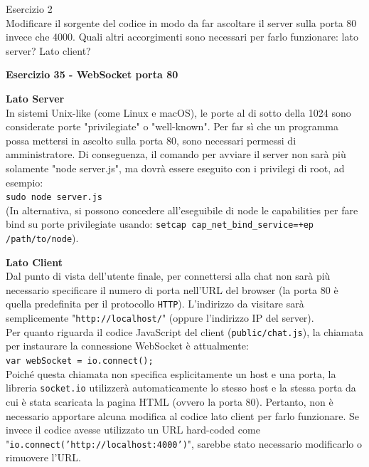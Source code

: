 \documentclass[11pt]{article}
\begin{document}
\begin{tcolorbox}[colback=blue!5!white,colframe=blue!75!black,title=\textbf{DOMANDA}, breakable]
Esercizio 2\\
Modificare il sorgente del codice in modo da far ascoltare il server sulla porta 80 invece che 4000. Quali altri accorgimenti sono necessari per farlo funzionare: lato server? Lato client?
\end{tcolorbox}

\begin{tcolorbox}[colback=green!5!white,colframe=green!75!black,title=\textbf{RISPOSTA}, breakable]
\textbf{Esercizio 35 - WebSocket porta 80}

\textbf{Lato Server}\\
In sistemi Unix-like (come Linux e macOS), le porte al di sotto della 1024 sono considerate porte "privilegiate" o "well-known". Per far sì che un programma possa mettersi in ascolto sulla porta 80, sono necessari permessi di amministratore. Di conseguenza, il comando per avviare il server non sarà più solamente "node server.js", ma dovrà essere eseguito con i privilegi di root, ad esempio:\\
\texttt{sudo node server.js}\\
(In alternativa, si possono concedere all'eseguibile di node le capabilities per fare bind su porte privilegiate usando: \texttt{setcap cap\_net\_bind\_service=+ep /path/to/node}).

\textbf{Lato Client}\\
Dal punto di vista dell'utente finale, per connettersi alla chat non sarà più necessario specificare il numero di porta nell'URL del browser (la porta 80 è quella predefinita per il protocollo \texttt{HTTP}). L'indirizzo da visitare sarà semplicemente "\texttt{http://localhost/}" (oppure l'indirizzo IP del server).\\
Per quanto riguarda il codice JavaScript del client (\texttt{public/chat.js}), la chiamata per instaurare la connessione WebSocket è attualmente:\\
\texttt{var webSocket = io.connect();}\\
Poiché questa chiamata non specifica esplicitamente un host e una porta, la libreria \texttt{socket.io} utilizzerà automaticamente lo stesso host e la stessa porta da cui è stata scaricata la pagina HTML (ovvero la porta 80). Pertanto, non è necessario apportare alcuna modifica al codice lato client per farlo funzionare. Se invece il codice avesse utilizzato un URL hard-coded come "\texttt{io.connect('http://localhost:4000')}", sarebbe stato necessario modificarlo o rimuovere l'URL.
\end{tcolorbox}
\end{document}

